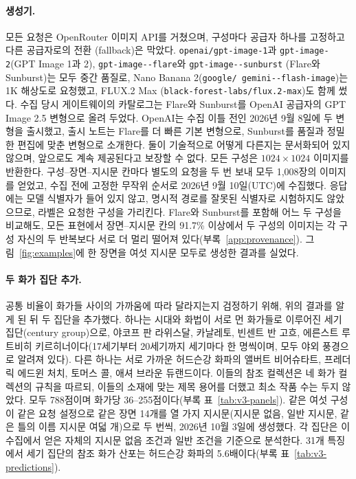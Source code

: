 \documentclass[10pt]{article}
\newcommand{\term}[1]{\textsf{#1}}
\begin{document}
\paragraph{생성기.}
모든 요청은 OpenRouter 이미지 API를 거쳤으며, 구성마다 공급자 하나를 고정하고 다른 공급자로의 전환
(fallback)은 막았다. \texttt{openai/\allowbreak gpt-\allowbreak image-1}과
\texttt{gpt-\allowbreak image-2}(GPT Image 1과 2), \texttt{gpt-\allowbreak image--\allowbreak flare}와 \texttt{gpt-\allowbreak image--\allowbreak sunburst}
(Flare와 Sunburst)는 모두 중간 품질로, Nano Banana 2(\texttt{google/\allowbreak
gemini--\allowbreak flash-\allowbreak image})는 1K 해상도로 요청했고, FLUX.2 Max
(\texttt{black-\allowbreak forest-\allowbreak labs/\allowbreak flux.2-\allowbreak max})도 함께
썼다. 수집 당시 게이트웨이의 카탈로그는 Flare와 Sunburst를 OpenAI 공급자의 GPT Image 2.5 변형으로
올려 두었다. OpenAI는 수집 이틀 전인 2026년 9월 8일에 두 변형을 출시했고, 출시 노트는 Flare를 더 빠른
기본 변형으로, Sunburst를 품질과 정밀한 편집에 맞춘 변형으로 소개한다. 둘이 기술적으로 어떻게 다른지는
문서화되어 있지 않으며, 앞으로도 계속 제공된다고 보장할 수 없다. 모든 구성은 $1024\times1024$ 이미지를
반환한다. 구성--장면--지시문 칸마다 별도의 요청을 두 번 보내 모두 1,008장의 이미지를 얻었고, 수집 전에
고정한 무작위 순서로 2026년 9월 10일(UTC)에 수집했다. 응답에는 모델 식별자가 들어 있지 않고, 명시적
경로를 잘못된 식별자로 시험하지도 않았으므로, 라벨은 요청한 구성을 가리킨다. Flare와 Sunburst를 포함해
어느 두 구성을 비교해도, 모든 표현에서 장면--지시문 칸의 91.7\% 이상에서 두 구성의 이미지는 각 구성
자신의 두 반복보다 서로 더 멀리 떨어져 있다(부록~\ref{app:provenance}). 그림~\ref{fig:examples}에
한 장면을 여섯 지시문 모두로 생성한 결과를 실었다.

\paragraph{두 화가 집단 추가.} 공통 비율이 화가들 사이의 가까움에 따라 달라지는지 검정하기 위해, 위의
결과를 알게 된 뒤 두 집단을 추가했다. 하나는 시대와 화법이 서로 먼 화가들로 이루어진 \term{세기
집단}(century group)으로, 야코프 판 라위스달, 카날레토, 빈센트 반 고흐, 에른스트 루트비히
키르히너이다(17세기부터 20세기까지 세기마다 한 명씩이며, 모두 야외 풍경으로 알려져 있다). 다른 하나는
서로 가까운 허드슨강 화파의 앨버트 비어슈타트, 프레더릭 에드윈 처치, 토머스 콜, 애셔 브라운
듀랜드이다. 이들의 참조 컬렉션은 네 화가 컬렉션의 규칙을 따르되, 이들의 소재에 맞는 제목 용어를 더했고
최소 작품 수는 두지 않았다. 모두 788점이며 화가당 36--255점이다(부록 표~\ref{tab:v3-panels}). 같은
여섯 구성이 같은 요청 설정으로 같은 장면 14개를 열 가지 지시문(지시문 없음, 일반 지시문, 같은 틀의 이름
지시문 여덟 개)으로 두 번씩, 2026년 10월 3일에 생성했다. 각 집단은 이 수집에서 얻은 자체의 지시문 없음
조건과 일반 조건을 기준으로 분석한다. 31개 특징에서 세기 집단의 참조 화가 산포는 허드슨강 화파의
5.6배이다(부록 표~\ref{tab:v3-predictions}).
\end{document}
